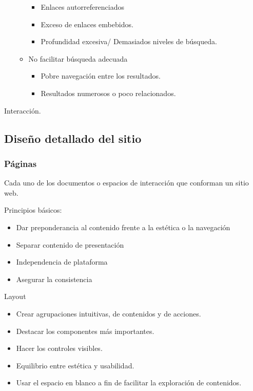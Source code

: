 \documentclass[12pt, twoside, openright]{report} %
\begin{document}
\begin{itemize}
\begin{itemize}
		            \begin{itemize}
			            \item Enlaces autorreferenciados

			            \item Exceso de enlaces embebidos.

			            \item Profundidad excesiva/ Demasiados
			                  niveles de búsqueda.
		            \end{itemize}

		      \item No facilitar búsqueda adecuada

		            \begin{itemize}
			            \item Pobre navegación entre los
			                  resultados.

			            \item Resultados numerosos o poco relacionados.
		            \end{itemize}
	      \end{itemize}
\end{itemize}

Interacción.

\subsection{Diseño detallado del sitio}
\subsubsection{Páginas}
Cada uno de los documentos o espacios de interacción que conforman un sitio
web.

Principios básicos:
\begin{itemize}
	\item Dar preponderancia al contenido frente a
	      la estética o la navegación
	\item Separar contenido de presentación
	\item Independencia de plataforma
	\item Asegurar la consistencia
\end{itemize}

Layout
\begin{itemize}
	\item Crear agrupaciones intuitivas, de contenidos y de acciones.
	\item Destacar los componentes más importantes.
	\item Hacer los controles visibles.
	\item Equilibrio entre estética y usabilidad.
	\item Usar el espacio en blanco a
	      fin de facilitar la exploración de contenidos.
\end{itemize}
\end{document}
